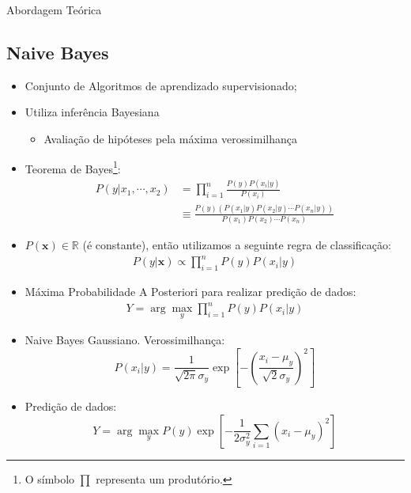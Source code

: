 \documentclass[compress]{beamer}
\begin{document}
\begin{frame}{Abordagem Teórica}
\subsection{Naive Bayes}
\begin{itemize}
    \item Conjunto de Algoritmos de aprendizado supervisionado;
    \item Utiliza inferência Bayesiana
    \begin{itemize}
        \item Avaliação de hipóteses pela máxima verossimilhança
    \end{itemize}
    \item Teorema de Bayes\footnote{O símbolo $\prod$ representa um produtório.}: \begin{align}
    P\left(y|x_{1},\cdots,x_{2}\right)&=\prod_{i=1}^{n}\frac{P(y)P(x_i|y)}{P(x_i)}\\
    &\equiv \frac{P(y)\left(P(x_1|y)P(x_2|y)\cdots P(x_n|y)\right)}{P(x_1)P(x_2)\cdots P(x_n)}\nonumber
    \end{align}
    \item $P(\mathbf{x})\in\mathbb{R}$ (é constante), então utilizamos a seguinte regra de classificação:
    \begin{align}
        P(y|\mathbf{x})\propto \prod_{i=1}^{n}P(y)P(x_i|y)
    \end{align}
\end{itemize}
\end{frame}

\begin{frame}{}
    \begin{itemize}
        \item Máxima Probabilidade A Posteriori para realizar predição de dados:
        \begin{align}
            Y=\arg \max_{y} \prod_{i=1}^{n}P(y)P(x_i|y)
        \end{align}
        \item Naive Bayes Gaussiano. Verossimilhança\cite{scikit-learn}:
        $$P\left(x_i|y\right)=\frac{1}{\sqrt{2\pi}\sigma_{y}}\exp\left[-\left(\frac{x_i-\mu_y}{\sqrt{2}\sigma_y}\right)^2\right]$$
        \item Predição de dados:
        $$\displaystyle Y=\arg \max_{y}P(y)\exp\left[-\frac{1}{2\sigma_y^2}\sum_{i=1}\left(x_i-\mu_y\right)^2\right]$$
    \end{itemize}
\end{frame}
\end{document}
